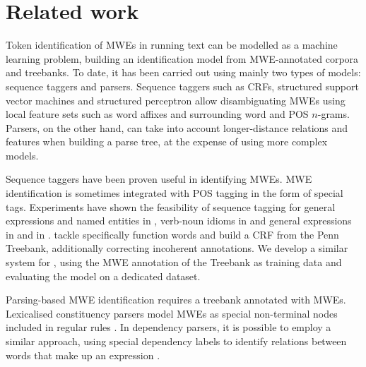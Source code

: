 \documentclass[output=paper,
modfonts
]{langscibook}
\begin{document}
\section{Related work}
\label{schol:sec:relwork}

Token identification of MWEs in running text can be modelled as a machine learning problem, building an identification model from MWE-annotated corpora and treebanks.
To date, it has been carried out using mainly two types of models: sequence taggers and parsers. Sequence taggers such as CRFs, structured support vector machines and structured perceptron allow disambiguating MWEs using local feature sets such as word affixes and surrounding word and POS $n$-grams. Parsers, on the other hand, can take into account longer-distance relations and features when building a parse tree, at the expense of using more complex models. 

Sequence taggers have been proven useful in identifying MWEs. MWE identification is sometimes integrated with POS tagging in the form of special tags. Experiments have shown the feasibility of sequence tagging for general expressions and named entities in  \citep{vincze-nagyt-berend:2011:MWE}, verb-noun idioms in  \citep{diab-bhutada:2009:MWE09} and general expressions in  \citep{constant-sigogne:2011:MWE}
and in  \citep{Schneider14b,riedl-biemann:2016:MWE}. \citet{shigeto-EtAl:2013:MWE}  tackle specifically  function words and build a CRF from the Penn Treebank, additionally correcting incoherent annotations. We develop a similar system for , using the MWE annotation of the  Treebank as training data and evaluating the model on a dedicated dataset.

Parsing-based MWE identification requires a treebank annotated with MWEs. Lexicalised constituency parsers model MWEs as special non-terminal nodes included in regular rules \citep{Green:2013:PMI:2464100.2464109}. In dependency parsers, it is possible to employ a similar approach, using special dependency labels to identify relations between words that make up an expression \citep{candito-constant:acl:2014}. 
\end{document}
